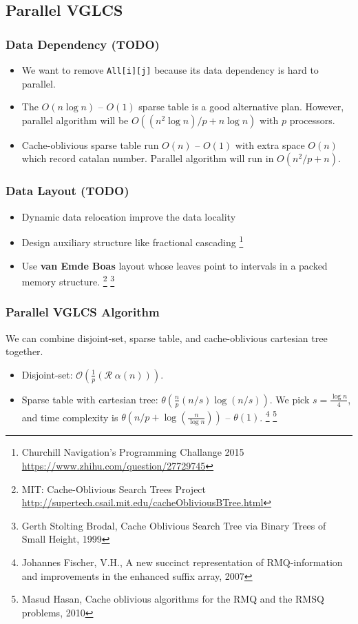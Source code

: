 \subsection{Parallel VGLCS}
\begin{frame}
	\frametitle{Data Dependency (TODO)}
	\begin{itemize}
		\setlength\itemsep{1em}
		\item We want to remove \texttt{All[i][j]} because its data dependency 
			is hard to parallel.
		\item The $O(n \log n)$ -- $O(1)$ sparse table is a good alternative plan. 
			However, parallel algorithm will be $O((n^2 \log n) / p + n \log n)$ with $p$ processors.
		\item Cache-oblivious sparse table run $O(n)$ -- $O(1)$ 
			with extra space $O(n)$ which record catalan number. 
			Parallel algorithm will run in $O(n^2 / p + n)$.
	\end{itemize}
\end{frame}

\begin{frame}
	\frametitle{Data Layout (TODO)}
	\begin{itemize}
		\setlength\itemsep{1em}
		\item Dynamic data relocation improve the data locality
		\item Design auxiliary structure like fractional cascading
		\footnote{Churchill Navigation's Programming Challange 2015 \url{https://www.zhihu.com/question/27729745}}
		\item Use \textbf{van Emde Boas} layout whose leaves point to intervals in a packed memory structure.
		\footnote{MIT: Cache-Oblivious Search Trees Project \url{http://supertech.csail.mit.edu/cacheObliviousBTree.html}}
		\footnote{Gerth Stolting Brodal, Cache Oblivious Search Tree via Binary Trees of Small Height, 1999}
	\end{itemize}
\end{frame}

\begin{frame}
	\frametitle{Parallel VGLCS Algorithm}
	We can combine disjoint-set, sparse table, and cache-oblivious cartesian tree together.
	\begin{itemize}
		\setlength\itemsep{1em}
		\item Disjoint-set: $\mathcal{O}(\frac{1}{p}(\mathcal{R} \; \alpha(n)))$.
		\item Sparse table with cartesian tree: $\mathcal{\theta}(\frac{n}{p} (n/s) \log (n/s))$.  
		We pick $s = \frac{\log n}{4}$, and time complexity is $\mathcal{\theta}\left(n/p + \log \left(\frac{n}{\log n}\right)\right)$ -- $\mathcal{\theta}(1)$.
		\footnote{Johannes Fischer, V.H., A new succinct representation of RMQ-information and improvements in the enhanced suffix array, 2007}
		\footnote{Masud Hasan, Cache oblivious algorithms for the RMQ and the RMSQ problems, 2010}
	\end{itemize}
\end{frame}

